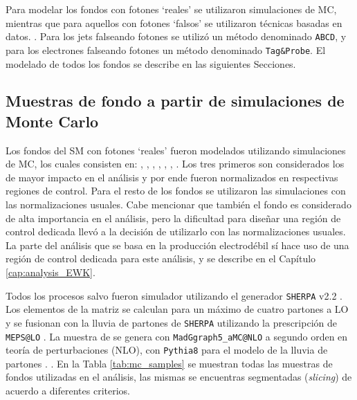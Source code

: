 Para modelar los fondos con fotones `reales' se utilizaron simulaciones de MC, mientras que para aquellos con fotones `falsos' se utilizaron técnicas basadas en datos. . Para los jets falseando fotones se utilizó un método denominado \texttt{ABCD}, y para los electrones falseando fotones un método denominado \texttt{Tag\&Probe}. El modelado de todos los fondos se describe en las siguientes Secciones.

\subsection{Muestras de fondo a partir de simulaciones de Monte Carlo}

Los fondos del SM con fotones `reales' fueron modelados utilizando simulaciones de MC, los cuales consisten en: \phj, \wph, \ttbarph, \wphph, \zph, \zphph, \phph. Los tres primeros son considerados los de mayor impacto en el análisis y por ende fueron normalizados en respectivas regiones de control. Para el resto de los fondos se utilizaron las simulaciones con las normalizaciones usuales. 
Cabe mencionar que también el fondo \znunuph es considerado de alta importancia en el análisis, pero la dificultad para diseñar una región de control dedicada llevó a la decisión de utilizarlo con las normalizaciones usuales. La parte del análisis que se basa en la producción electrodébil  sí hace uso de una región de control dedicada para este análisis, y se describe en el Capítulo \ref{cap:analysis_EWK}.

Todos los procesos salvo \ttbarph fueron simulador utilizando el generador \texttt{SHERPA} v2.2 \cite{Bothmann:2019yzt}. Los elementos de la matriz se calculan para un máximo de cuatro partones
a LO y se fusionan con la lluvia de partones de \texttt{SHERPA} \cite{Schumann:2007mg} utilizando la prescripción de \texttt{MEPS@LO} \cite{Hoeche:2012yf}. La muestra de \ttbarph se genera con \texttt{MadGgraph5\_aMC@NLO} \cite{Alwall:2014hca} a segundo orden en teoría de perturbaciones (NLO), con \texttt{Pythia8} para el modelo de la lluvia de partones \cite{Sjostrand:2014zea}. . En la Tabla \ref{tab:mc_samples} se muestran todas las muestras de fondos utilizadas en el análisis, las mismas se encuentras segmentadas (\textit{slicing}) de acuerdo a diferentes criterios.

